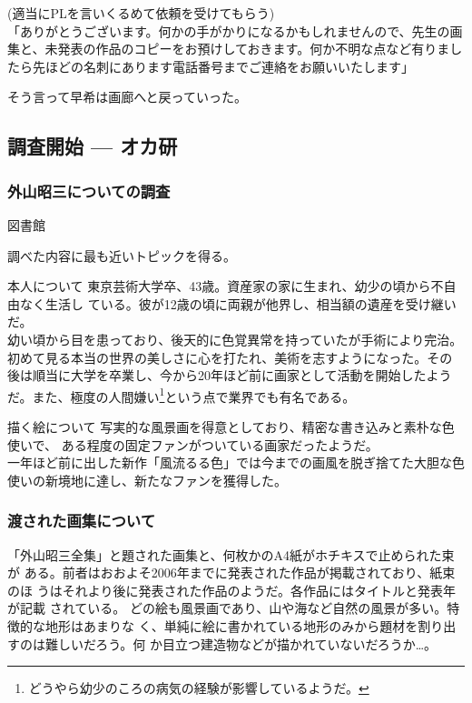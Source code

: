 \documentclass[a4paper,8pt,min]{jsarticle}
\begin{document}
(適当にPLを言いくるめて依頼を受けてもらう)\\

「ありがとうございます。何かの手がかりになるかもしれませんので、先生の画
集と、未発表の作品のコピーをお預けしておきます。何か不明な点など有りまし
たら先ほどの名刺にあります電話番号までご連絡をお願いいたします」

そう言って早希は画廊へと戻っていった。

\subsection{調査開始 --- オカ研}
\subsubsection{外山昭三についての調査}

\begin{judge}{図書館}
 \item 調べた内容に最も近いトピックを得る。

\end{judge}

\begin{topic}
  \item[本人について]
 東京芸術大学卒、43歳。資産家の家に生まれ、幼少の頃から不自由なく生活し
 ている。彼が12歳の頃に両親が他界し、相当額の遺産を受け継いだ。\\
 幼い頃から目を患っており、後天的に色覚異常を持っていたが手術により完治。
 初めて見る本当の世界の美しさに心を打たれ、美術を志すようになった。その
 後は順当に大学を卒業し、今から20年ほど前に画家として活動を開始したよう
 だ。また、極度の人間嫌い\footnote{どうやら幼少のころの病気の経験が影響しているようだ。}という点で業界でも有名である。

  \item[描く絵について]
  写実的な風景画を得意としており、精密な書き込みと素朴な色使いで、
  ある程度の固定ファンがついている画家だったようだ。\\
  一年ほど前に出した新作「風流るる色」では今までの画風を脱ぎ捨てた大胆な色
  使いの新境地に達し、新たなファンを獲得した。
\end{topic}
\newpage

\subsubsection{渡された画集について}
「外山昭三全集」と題された画集と、何枚かのA4紙がホチキスで止められた束が
ある。前者はおおよそ2006年までに発表された作品が掲載されており、紙束のほ
うはそれより後に発表された作品のようだ。各作品にはタイトルと発表年が記載
されている。
どの絵も風景画であり、山や海など自然の風景が多い。特徴的な地形はあまりな
く、単純に絵に書かれている地形のみから題材を割り出すのは難しいだろう。何
か目立つ建造物などが描かれていないだろうか…。\\
\end{document}
